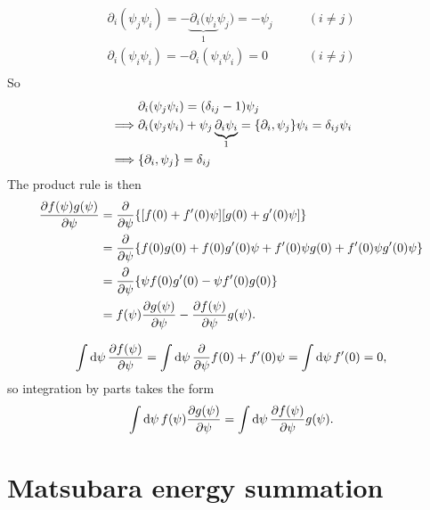 \begin{equation}
\begin{split}
	\partial_i (\psi_j \psi_i) = -\underbrace{\partial_i (\psi_i}_{1} \psi_j) = -\psi_j & \qquad (i \neq j) \\
	\partial_i (\psi_i \psi_i) = -\partial_i (\psi_i \psi_i) = 0                        & \qquad (i \neq j) \\
\end{split}
\end{equation}
So
\begin{equation}
\begin{split}
	         & \partial_i (\psi_j \psi_i) = (\delta_{ij} - 1) \psi_j \\
	\implies & \partial_i (\psi_j \psi_i) + \psi_j \underbrace{\partial_i \psi_i}_{1} = \{ \partial_i , \psi_j \} \psi_i = \delta_{ij} \psi_i \\
	\implies & \{ \partial_i , \psi_j \} = \delta_{ij}
\end{split}
\end{equation}
The product rule is then
\begin{equation}
\begin{split}
	\pdv{f(\psi) g(\psi)}{\psi} &= \pdv*{\{[f(0) + f'(0) \psi][g(0) + g'(0) \psi]\}}{\psi} \\
	                            &= \pdv*{\{f(0) g(0) + f(0) g'(0) \psi + f'(0) \psi g(0) + f'(0) \psi g'(0) \psi\}}{\psi} \\
	                            &= \pdv*{\{ \psi f(0) g'(0) - \psi f'(0) g(0) \}}{\psi} \\
	                            &= f(\psi) \pdv{g(\psi)}{\psi} - \pdv{f(\psi)}{\psi} g(\psi) .
\end{split}
\end{equation}

\begin{equation}
	\int \mathop{}\!\mathrm{d} \psi \, \pdv{f(\psi)}{\psi} =
	\int \mathop{}\!\mathrm{d} \psi \, \pdv*{f(0) + f'(0) \psi}{\psi} =
	\int \mathop{}\!\mathrm{d} \psi \, f'(0) =
	0 ,
\end{equation}
so integration by parts takes the form
\begin{equation}
	\int \mathop{}\!\mathrm{d} \psi \, f(\psi) \pdv{g(\psi)}{\psi} = \int \mathop{}\!\mathrm{d} \psi \, \pdv{f(\psi)}{\psi} g(\psi) .
\end{equation}


\chapter{Matsubara energy summation}
\label{chap:matsum}

